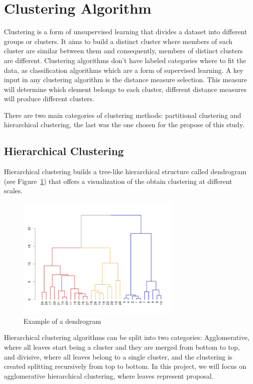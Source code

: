 \section{Clustering Algorithm}
Clustering is a form of unsupervised learning that divides a dataset into different groups or clusters.
It aims to build a distinct cluster where members of each cluster are similar between them and consequently, members of distinct clusters are different.
Clustering algorithms don't have labeled categories where to fit the data, as classification algorithms which are a form of supervised learning.
A key input in any clustering algorithm is the distance measure selection. This measure will determine which element belongs to each cluster, different distance measures will produce different clusters\cite{manning2008introduction}.

There are two main categories of clustering methods: partitional clustering and hierarchical clustering, the last was the one chosen for the propose of this study.

\subsection{Hierarchical Clustering}
Hierarchical clustering builds a tree-like hierarchical structure called dendrogram (see Figure~\ref{fig:dendrogram}) that offers a visualization of the obtain clustering at different scales.

\begin{figure}[h]
\centering
\includegraphics[width=8cm]{Figures/dendrogram.png}
\caption{Example of a dendrogram}
\label{fig:dendrogram}
\end{figure}

Hierarchical clustering algorithms can be split into two categories: Agglomerative, where all leaves start being a cluster and they are merged from bottom to top, and divisive, where all leaves belong to a single cluster, and the clustering is created splitting recursively from top to bottom\cite{clusteringSurvey}. In this project, we will focus on agglomerative hierarchical clustering, where leaves represent proposal.

